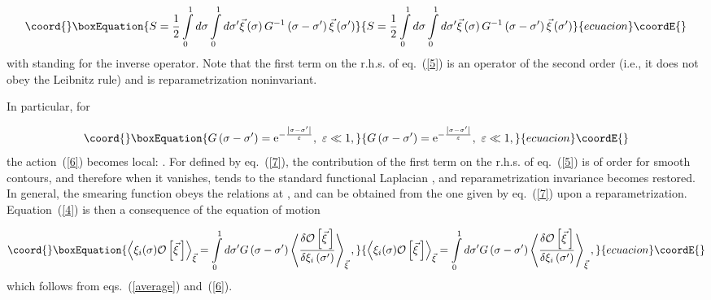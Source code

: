 \documentclass[a4paper,12pt]{article}
\begin{document}
\begin{equation}\coord{}\boxEquation{
\label{6}
S=\frac{1}{2}\int\limits_0^1 d\sigma\int\limits_0^1 d\sigma^
\prime\vec\xi\left(\sigma\right)G^{-1}\left(\sigma-\sigma^\prime
\right)\vec\xi\left(\sigma^
\prime\right)
}{
S=\frac{1}{2}\int\limits_0^1 d\sigma\int\limits_0^1 d\sigma^
\prime\vec\xi\left(\sigma\right)G^{-1}\left(\sigma-\sigma^\prime
\right)\vec\xi\left(\sigma^
\prime\right)
}{ecuacion}\coordE{}\end{equation}
with \coordHE{} standing for the inverse operator.
Note that the first term on the r.h.s. of eq.~(\ref{5}) is an operator of the second
order (i.e., it does not obey the Leibnitz rule) and is reparametrization noninvariant.

In particular, for

\begin{equation}\coord{}\boxEquation{
\label{7}
G\left(\sigma-\sigma^\prime\right)={\rm e}^{-\frac{\left|\sigma-
\sigma^\prime\right|}
{\varepsilon}},~
\varepsilon\ll 1,
}{
G\left(\sigma-\sigma^\prime\right)={\rm e}^{-\frac{\left|\sigma-
\sigma^\prime\right|}
{\varepsilon}},~
\varepsilon\ll 1,
}{ecuacion}\coordE{}\end{equation}
the action~(\ref{6}) becomes local: \coordHE{}. For \coordHE{} defined
by eq.~(\ref{7}), the contribution of the first term on the r.h.s. of eq.~(\ref{5}) is of
order \myHighlight{$\varepsilon$}\coordHE{} for smooth contours, and therefore
when \coordHE{} it vanishes,
\coordHE{} tends to the standard functional Laplacian
\myHighlight{$\Delta$}\coordHE{}, and reparametrization invariance becomes restored. In general, the smearing function
\coordHE{} obeys the relations \coordHE{} at \coordHE{}, \coordHE{} and
can be obtained from the one given by eq.~(\ref{7}) upon a reparametrization.
Equation~(\ref{4}) is then a consequence of the equation of motion

\begin{equation}\coord{}\boxEquation{
\label{eqm}
\left<\xi_i(\sigma){\cal O}\left[\vec\xi{\,}\right]\right>_{\vec\xi}=
\int\limits_0^1 d\sigma^\prime G\left(\sigma-\sigma^\prime\right)\left<\frac{
\delta{\cal O}\left[\vec\xi{\,}\right]}{\delta\xi_i\left(\sigma^\prime
\right)}\right>_{\vec\xi},
}{
\left<\xi_i(\sigma){\cal O}\left[\vec\xi{\,}\right]\right>_{\vec\xi}=
\int\limits_0^1 d\sigma^\prime G\left(\sigma-\sigma^\prime\right)\left<\frac{
\delta{\cal O}\left[\vec\xi{\,}\right]}{\delta\xi_i\left(\sigma^\prime
\right)}\right>_{\vec\xi},
}{ecuacion}\coordE{}\end{equation}
which follows from eqs.~(\ref{average}) and~(\ref{6}).
\end{document}
